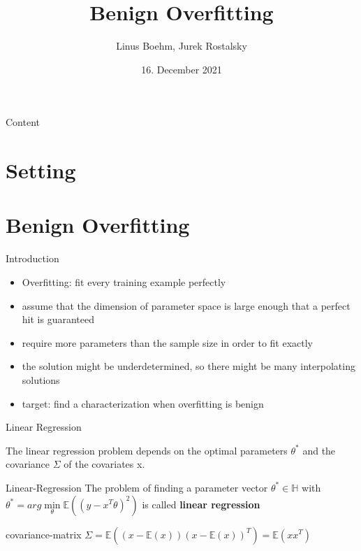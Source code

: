 \documentclass{beamer}
\title{Benign Overfitting}
\date{16. December 2021}
\author{Linus Boehm, Jurek Rostalsky}
\begin{document}
\maketitle

\begin{frame}{Content}
\tableofcontents
\end{frame}

\section{Setting}
\section{Benign Overfitting}

\begin{frame}{Introduction}
\begin{itemize}
	\item Overfitting: fit every training example perfectly
	\item assume that the dimension of parameter space is large enough that a perfect hit is guaranteed 
	\item require more parameters than the sample size in order to fit exactly
	\item the solution might be underdetermined, so there might be many interpolating solutions
	\item target: find a characterization when overfitting is benign
\end{itemize}
\end{frame}


\begin{frame}{Linear Regression}
	
The linear regression problem depends on the optimal parameters $\theta^*$ and the covariance $\Sigma$ of the covariates x.

\begin{center}
\begin{block}{Linear-Regression}
The problem of finding a parameter vector \(\theta^\ast \in \mathbb{H}\) with 
$\theta^\ast = arg \min\limits_\theta \mathbb{E}\left((y - x^T \theta)^2\right)$
is called \textbf{linear regression}
\end{block}
\begin{block}{covariance-matrix}
$\Sigma = \mathbb{E}\left(\left(x - \mathbb{E}(x)\right)\left(x - \mathbb{E}(x)\right)^T\right) =  \mathbb{E}(xx^T)$
\end{block}
\end{center}
\end{frame}
\end{document}
